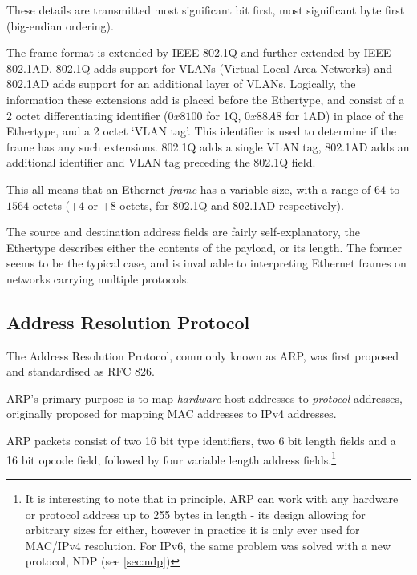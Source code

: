 \documentclass[10pt,a4paper,notitlepage,twoside]{report}
\begin{document}
These details are transmitted most significant bit first, most significant byte first (big-endian ordering).

The frame format is extended by IEEE 802.1Q and further extended by IEEE 802.1AD. 802.1Q adds support for VLANs (Virtual Local Area Networks) and 802.1AD adds support for an additional layer of VLANs.
Logically, the information these extensions add is placed before the Ethertype, and consist of a 2 octet differentiating identifier ($0x8100$ for 1Q, $0x88A8$ for 1AD) in place of the Ethertype, and a 2 octet `VLAN tag'. This identifier is used to determine if the frame has any such extensions. 802.1Q adds a single VLAN tag, 802.1AD adds an additional identifier and VLAN tag preceding the 802.1Q field.

This all means that an Ethernet \emph{frame} has a variable size, with a range of $64$ to $1564$ octets ($+4$ or $+8$ octets, for 802.1Q and 802.1AD respectively).

The source and destination address fields are fairly self-explanatory, the Ethertype describes either the contents of the payload, or its length. The former seems to be the typical case, and is invaluable to interpreting Ethernet frames on networks carrying multiple protocols.

\subsection{Address Resolution Protocol}
\label{sec:arp}
The Address Resolution Protocol, commonly known as ARP, was first proposed and standardised as RFC 826\cite{rfc826}.

ARP's primary purpose is to map \emph{hardware} host addresses to \emph{protocol} addresses, originally proposed for mapping MAC addresses to IPv4 addresses.

ARP packets consist of two 16 bit type identifiers, two 6 bit length fields and a 16 bit opcode field, followed by four variable length address fields.\footnote{It is interesting to note that in principle, ARP can work with any hardware or protocol address up to 255 bytes in length - its design allowing for arbitrary sizes for either, however in practice it is only ever used for MAC/IPv4 resolution. For IPv6, the same problem was solved with a new protocol, NDP (see \ref{sec:ndp})}
\end{document}
